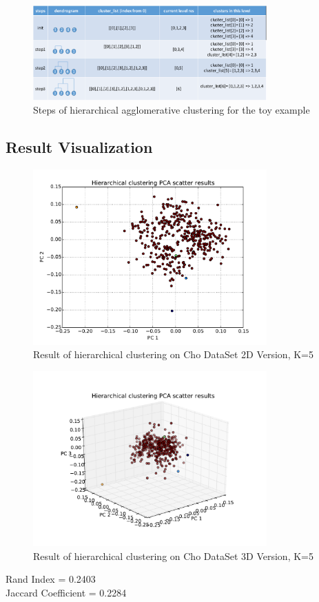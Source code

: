 \documentclass[paper=letter, fontsize=11pt]{article}
\numberwithin{equation}{section}		%
\numberwithin{figure}{section}			%
\numberwithin{table}{section}				%
\begin{document}
\begin{figure}[H]
	\centering
	\includegraphics[width=0.8\textwidth]{example_table.pdf}
	\caption{ Steps of hierarchical agglomerative clustering for the toy example}
\end{figure}


\subsection{Result Visualization}
\begin{figure}[H]
	\centering
	\includegraphics[width=0.8\textwidth]{H_cho_2D.pdf}
	\caption{Result of hierarchical clustering on Cho DataSet 2D Version, K=5}
\end{figure}

\begin{figure}[H]
	\centering
	\includegraphics[width=0.8\textwidth]{H_cho_3D.pdf}
	\caption{Result of hierarchical clustering on Cho DataSet 3D Version, K=5}
\end{figure}
\noindent Rand Index = 0.2403\\
Jaccard Coefficient = 0.2284\\
\end{document}
